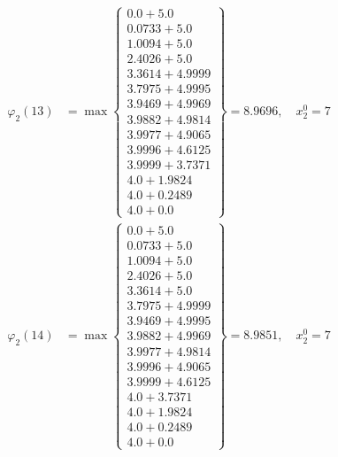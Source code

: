\documentclass{article}
\begin{document}
\begin{align*}
  
  
  
\varphi_{2}(13) &= \max \left\{ \begin{array}{c}
0.0 + 5.0 \\
 0.0733 + 5.0 \\
 1.0094 + 5.0 \\
 2.4026 + 5.0 \\
 3.3614 + 4.9999 \\
 3.7975 + 4.9995 \\
 3.9469 + 4.9969 \\
 3.9882 + 4.9814 \\
 3.9977 + 4.9065 \\
 3.9996 + 4.6125 \\
 3.9999 + 3.7371 \\
 4.0 + 1.9824 \\
 4.0 + 0.2489 \\
 4.0 + 0.0
\end{array} \right\}=8.9696,\quad x_{2}^0=7\\
  
  
  
  
\varphi_{2}(14) &= \max \left\{ \begin{array}{c}
0.0 + 5.0 \\
 0.0733 + 5.0 \\
 1.0094 + 5.0 \\
 2.4026 + 5.0 \\
 3.3614 + 5.0 \\
 3.7975 + 4.9999 \\
 3.9469 + 4.9995 \\
 3.9882 + 4.9969 \\
 3.9977 + 4.9814 \\
 3.9996 + 4.9065 \\
 3.9999 + 4.6125 \\
 4.0 + 3.7371 \\
 4.0 + 1.9824 \\
 4.0 + 0.2489 \\
 4.0 + 0.0
\end{array} \right\}=8.9851,\quad x_{2}^0=7\\
  
  
  

\end{align*}
\end{document}

